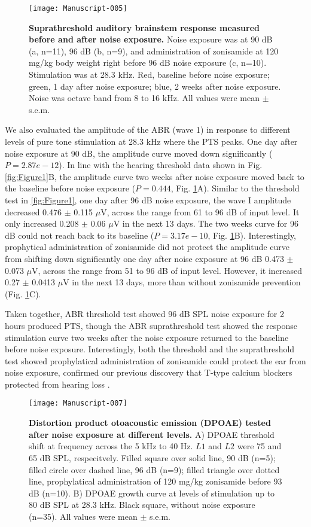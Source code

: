 \documentclass[11pt]{article}
\begin{document}
\begin{figure}[ht]
\centering
\texttt{[image: Manuscript-005]}

\caption{{\bf {Suprathreshold auditory brainstem response measured before and after noise exposure.}}  Noise exposure was at 90 dB (a, n=11), 96 dB (b, n=9), and administration of zonisamide at 120 mg/kg body weight right before 96 dB noise exposure (c, n=10). Stimulation was at 28.3 kHz.  Red, baseline before noise exposure; green, 1 day after noise exposure; blue, 2 weeks after noise exposure.  Noise was octave band from 8 to 16 kHz. All values were mean $\pm$ s.e.m.}
\label{fig:Figure2}
\end{figure}

We also evaluated the amplitude of the ABR (wave 1) in response to different levels of pure tone stimulation at 28.3 kHz where the PTS peaks. One day after noise exposure at 90 dB, the amplitude curve moved down significantly ($P=2.87e-12$). In line with the hearing threshold data shown in Fig. \ref{fig:Figure1}B, the amplitude curve two weeks after noise exposure moved back to the baseline before noise exposure 
($P=0.444$, Fig. \ref{fig:Figure2}A). Similar to the threshold test in \ref{fig:Figure1}, one day after 96 dB noise exposure, the wave I amplitude decreased 0.476 
$\pm$ 
0.115 $\mu$V, across the range from 61 to 96 dB of input level. It only increased 0.208 
$\pm$ 
0.06 $\mu$V in the next 13 days. The two weeks curve for 96 dB could not reach back to its baseline 
($P=3.17e-10$, Fig. \ref{fig:Figure2}B). Interestingly, prophytical administration of zonisamide did not protect the amplitude curve from shifting down significantly one day after noise exposure at 96 dB 0.473 
$\pm$ 
0.073 $\mu$V, across the range from 51 to 96 dB of input level. However, it increased 0.27 
$\pm$ 
0.0413 $\mu$V in the next 13 days, more than without zonisamide prevention (Fig. \ref{fig:Figure2}C).

Taken together, ABR threshold test showed 96 dB SPL noise exposure for 2 hours produced PTS, though the ABR suprathreshold test showed the response stimulation curve two weeks after the noise exposure returned to the baseline before noise exposure. Interestingly, both the threshold and the suprathreshold test showed prophylatical administration of zonisamide could protect the ear from noise exposure, confirmed our previous discovery that T-type calcium blockers protected from hearing loss \cite{Shen2007,Lei2011}.




\begin{figure}[ht!]
\centering
\texttt{[image: Manuscript-007]}
\caption{{\bf {Distortion product otoacoustic emission (DPOAE) tested after noise exposure at different levels.}} A) DPOAE threshold shift at frequency across the 5 kHz to 40 Hz. $L1$ and $L2$ were 75 and 65 dB SPL, respecitvely. Filled square over solid line, 90 dB (n=5); filled circle over dashed line, 96 dB (n=9); filled triangle over dotted line, prophylatical administration of 120 mg/kg zonisamide before 93 dB (n=10). B) DPOAE growth curve at levels of stimulation up to 80 dB SPL at 28.3 kHz. Black square, without noise exposure (n=35). All values were  mean $\pm$ s.e.m. }
\label{fig:Figure3}
\end{figure}
\end{document}

